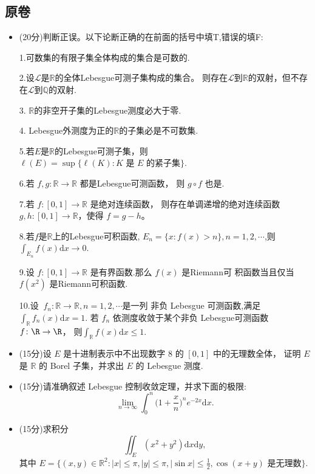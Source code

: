 \subsection{原卷}
\begin{itemize}
\item[一、](20分)判断正误。以下论断正确的在前面的括号中填T,错误的填F:

1.可数集的有限子集全体构成的集合是可数的.

2.设$ \mathcal{L}  $是$ \mathbb{R}  $的全体Lebesgue可测子集构成的集合。
则存在$ \mathcal{L}  $到$ \mathbb{R}  $的双射，但不存在$ \mathcal{L}  $到$ \mathbb{Q}  $的双射.

3. $ \mathbb{R}  $的非空开子集的Lebesgue测度必大于零.

4. Lebesgue外测度为正的$ \mathbb{R}  $的子集必是不可数集.

5.若$ E $是$ \mathbb{R}  $的Lebesgue可测子集，则 $\ell(E)=
 \sup\{\ell(K):K \text{ 是 }E\text{ 的紧子集}\}$.
 
6.若 $f,g\colon\mathbb{R} \to \mathbb{R} $ 都是Lebesgue可测函数，
则 $g\circ f$ 也是.

7.若 $f\colon[0,1]\to \mathbb{R} $ 是绝对连续函数，
则存在单调递增的绝对连续函数 $g,h\colon[0,1]\to \mathbb{R}$，使得 $f=g-h$。 

8.若$ f $是$ \mathbb{R}  $上的Lebesgue可积函数, $ E_{n}=\{x\colon f(x)>n\},n=1,2,\cdots $,则$ \int_{E_{n}}f(x)\mathrm{d} x\to 0 $.

9.设 $f\colon[0,1]\to \mathbb{R} $ 是有界函数.那么 $f(x)$ 是Riemann可
积函数当且仅当 $f(x^{2})$ 是Riemann可积函数.

10.设 $\ f_{n} \colon \mathbb{R} \to \mathbb{R} ,n=1,2,\cdots$是一列
非负 Lebesgue 可测函数,满足$ \int _{\mathbb{R} }f_{n}(x)\mathrm{d} x=1 $.
若 $f_{n}$ 依测度收敛于某个非负 Lebesgue可测函数$ f\colon\R \to \R$，
则$ \int_{\mathbb{R} }f(x)\mathrm{d} x\le1 $.

\item[二、](15分)设 $E$ 是十进制表示中不出现数字 $8$ 的 $[0,1]$ 中的无理数全体，
证明 $E$ 是 $\mathbb{R}$ 的 Borel 子集，并求出 $E$ 的 Lebesgue 测度.

\item[三、](15分)请准确叙述 Lebesgue 控制收敛定理，并求下面的极限:
$$ \lim_{n\to \infty}\int_{0}^{n}\Big(1+\frac{x}{n}\Big)^{n}e^{-2x}\mathrm{d} x. $$

\item[四、](15分)求积分
$$\iint_E\left(x^2+y^2\right) \mathrm{d} x \mathrm{d} y,$$
其中 $E=\{(x, y)\in \mathbb{R} ^{2}:|x| \leqslant \pi,|y| \leqslant \pi,|\sin x| \leqslant \frac{1}{2}, \cos (x+y) \text{ 是无理数} \}$.


\end{itemize}
